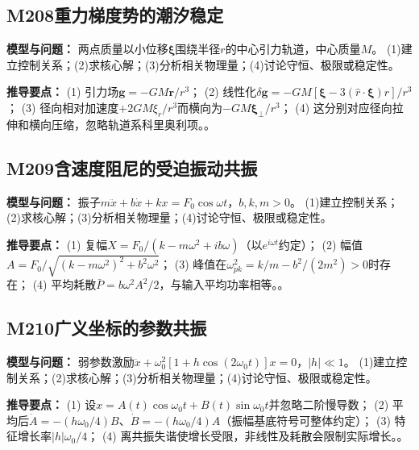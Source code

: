 \par\medskip

\subsection*{M208\quad 重力梯度势的潮汐稳定}

\textbf{模型与问题：} 两点质量以小位移$\boldsymbol\xi$围绕半径$r$的中心引力轨道，中心质量$M$。 (1)建立控制关系；(2)求核心解；(3)分析相关物理量；(4)讨论守恒、极限或稳定性。

\par\textbf{推导要点：} (1) 引力场$\mathbf g=-GM\mathbf r/r^3$； (2) 线性化$\delta\mathbf g=-GM[\boldsymbol\xi-3(\hat r\cdot\boldsymbol\xi)\hat r]/r^3$； (3) 径向相对加速度$+2GM\xi_r/r^3$而横向为$-GM\boldsymbol\xi_\perp/r^3$； (4) 这分别对应径向拉伸和横向压缩，忽略轨道系科里奥利项。。

\par\medskip

\subsection*{M209\quad 含速度阻尼的受迫振动共振}

\textbf{模型与问题：} 振子$m\ddot x+b\dot x+kx=F_0\cos\omega t$，$b,k,m>0$。 (1)建立控制关系；(2)求核心解；(3)分析相关物理量；(4)讨论守恒、极限或稳定性。

\par\textbf{推导要点：} (1) 复幅$X=F_0/(k-m\omega^2+ib\omega)$（以$e^{i\omega t}$约定）； (2) 幅值$A=F_0/\sqrt{(k-m\omega^2)^2+b^2\omega^2}$； (3) 峰值在$\omega_{pk}^2=k/m-b^2/(2m^2)>0$时存在； (4) 平均耗散$\bar P=b\omega^2A^2/2$，与输入平均功率相等。。

\par\medskip

\subsection*{M210\quad 广义坐标的参数共振}

\textbf{模型与问题：} 弱参数激励$\ddot x+\omega_0^2[1+h\cos(2\omega_0t)]x=0$，$|h|\ll1$。 (1)建立控制关系；(2)求核心解；(3)分析相关物理量；(4)讨论守恒、极限或稳定性。

\par\textbf{推导要点：} (1) 设$x=A(t)\cos\omega_0t+B(t)\sin\omega_0t$并忽略二阶慢导数； (2) 平均后$\dot A=-(h\omega_0/4)B$、$\dot B=-(h\omega_0/4)A$（振幅基底符号可整体约定）； (3) 特征增长率$|h|\omega_0/4$； (4) 离共振失谐使增长受限，非线性及耗散会限制实际增长。。

